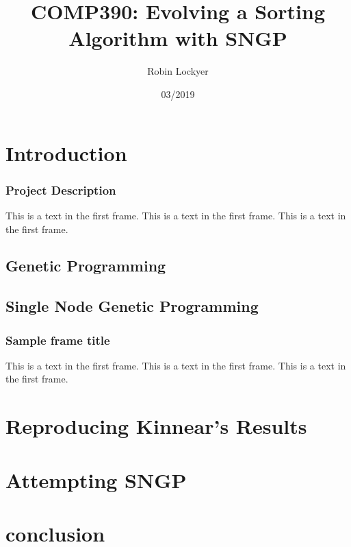 \documentclass{beamer}
\title{COMP390: Evolving a Sorting Algorithm with SNGP}
\author{Robin Lockyer}
\institute{University of Liverpool}
\date{03/2019}
\begin{document}
	
	\frame{\titlepage}
	
	\frame{\tableofcontents}
	
	\section{Introduction}
	
		\begin{frame}
			\frametitle{Project Description}
			This is a text in the first frame. This is a text in the first frame. This is a text in the first frame.
			
			
		\end{frame}
	
		\subsection{Genetic Programming}
		
		
		\subsection{Single Node Genetic Programming}
	
			\begin{frame}
				\frametitle{Sample frame title}
				This is a text in the first frame. This is a text in the first frame. This is a text in the first frame.
			\end{frame}
	
	\section{Reproducing Kinnear's Results}
	
	\section{Attempting SNGP}
	
	\section{conclusion}
		
\end{document}
